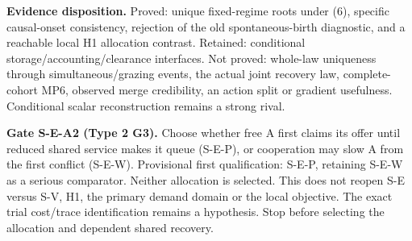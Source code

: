 \documentclass[11pt,a4paper]{article}
\begin{document}
\textbf{Evidence disposition.} Proved: unique fixed-regime roots under (6),
specific causal-onset consistency, rejection of the old spontaneous-birth
diagnostic, and a reachable local H1 allocation contrast. Retained:
conditional storage/accounting/clearance interfaces. Not proved: whole-law
uniqueness through simultaneous/grazing events, the actual joint recovery
law, complete-cohort MP6, observed merge credibility, an action split or
gradient usefulness. Conditional scalar reconstruction remains a strong rival.

\textbf{Gate S-E-A2 (Type 2 G3).} Choose whether free A first claims its
offer until reduced shared service makes it queue (S-E-P), or cooperation
may slow A from the first conflict (S-E-W). Provisional first qualification:
S-E-P, retaining S-E-W as a serious comparator. Neither allocation is selected.
This
does not reopen S-E versus S-V, H1, the primary demand domain or the local
objective. The exact trial cost/trace identification remains a hypothesis.
Stop before selecting the allocation and dependent shared recovery.
\end{document}
